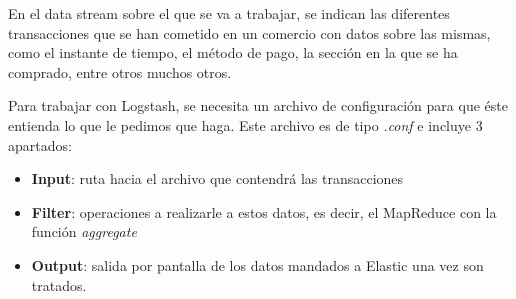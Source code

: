 En el data stream sobre el que se va a trabajar, se indican las diferentes transacciones que se han cometido en un comercio con datos sobre las mismas, como el instante de tiempo, el método de pago, la sección en la que se ha comprado, entre otros muchos otros.

Para trabajar con Logstash, se necesita un archivo de configuración para que éste entienda lo que le pedimos que haga. Este archivo es de tipo \textit{.conf} e incluye 3 apartados:
\begin{itemize}
    \item \textbf{Input}: ruta hacia el archivo que contendrá las transacciones
    \item \textbf{Filter}: operaciones a realizarle a estos datos, es decir, el MapReduce con la función \textit{aggregate}
    \item \textbf{Output}: salida por pantalla de los datos mandados a Elastic una vez son tratados.
\end{itemize}

\paragraph{}
\paragraph{}
\paragraph{}


